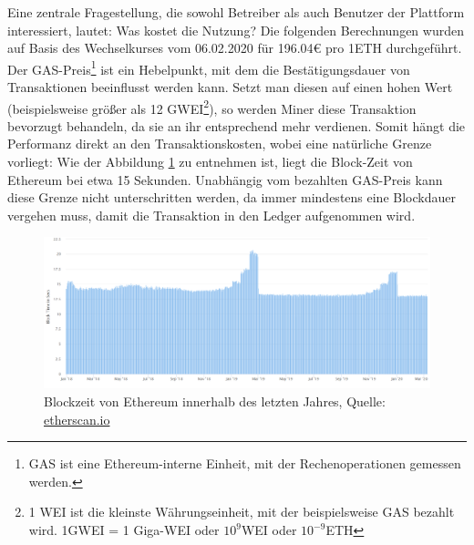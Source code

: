 Eine zentrale Fragestellung, die sowohl Betreiber als auch Benutzer der Plattform interessiert, lautet: Was kostet die Nutzung? Die folgenden Berechnungen wurden auf Basis des Wechselkurses vom 06.02.2020 für 196.04€ pro 1ETH durchgeführt.\\
Der GAS-Preis\footnote{GAS ist eine Ethereum-interne Einheit, mit der Rechenoperationen gemessen werden.} ist ein Hebelpunkt, mit dem die Bestätigungsdauer von Transaktionen beeinflusst werden kann. Setzt man diesen auf einen hohen Wert (beispielsweise größer als 12 GWEI\footnote{1 WEI ist die kleinste Währungseinheit, mit der beispielsweise GAS bezahlt wird. 1GWEI = 1 Giga-WEI oder $ 10^{9} $WEI oder $ 10^{-9} $ETH}), so werden Miner diese Transaktion bevorzugt behandeln, da sie an ihr entsprechend mehr verdienen. Somit hängt die Performanz direkt an den Transaktionskosten, wobei eine natürliche Grenze vorliegt: Wie der Abbildung \ref{fig:chapter07:blocktime} zu entnehmen ist, liegt die Block-Zeit von Ethereum bei etwa 15 Sekunden. Unabhängig vom bezahlten GAS-Preis kann diese Grenze nicht unterschritten werden, da immer mindestens eine Blockdauer vergehen muss, damit die Transaktion in den Ledger aufgenommen wird.

\begin{figure}[h]
 \centering
 \includegraphics[width=1.0\textwidth]{gfx/screenshots/blocktime_ETH.PNG}
 \caption{Blockzeit von Ethereum innerhalb des letzten Jahres, Quelle: \url{etherscan.io}}
 \label{fig:chapter07:blocktime}
\end{figure}

